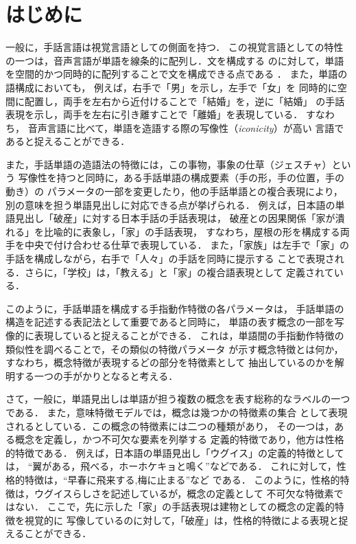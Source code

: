 \thispagestyle{plain}
\maketitle


\section {はじめに}\label{hajime}

一般に，手話言語は視覚言語としての側面を持つ．
この視覚言語としての特性の一つは，音声言語が単語を線条的に配列し．文を構成する
のに対して，単語を空間的かつ同時的に配列することで文を構成できる点である
\cite{Baker1980}．
また，単語の語構成においても，
例えば，右手で「男」を示し，左手で「女」を
同時的に空間に配置し，両手を左右から近付けることで「結婚」を，逆に「結婚」
の手話表現を示し，両手を左右に引き離すことで「離婚」を表現している．
すなわち，
音声言語に比べて，単語を造語する際の{\gt 写像性}（{\it iconicity}）が高い
言語であると捉えることができる．

また，手話単語の造語法の特徴には，この事物，事象の仕草（ジェスチャ）という
写像性を持つと同時に，ある手話単語の構成要素（手の形，手の位置，手の動き）の
パラメータの一部を変更したり，他の手話単語との複合表現により，
別の意味を担う単語見出しに対応できる点が挙げられる\cite{Ichida1994}．
例えば，日本語の単語見出し「破産」に対する日本手話の手話表現は，
破産との因果関係「家が潰れる」を比喩的に表象し，「家」の手話表現，
すなわち，屋根の形を構成する両手を中央で付け合わせる仕草で表現している．
また，「家族」は左手で「家」の手話を構成しながら，右手で「人々」の手話を同時に提示する
ことで表現される．さらに，「学校」は，「教える」と「家」の複合語表現として
定義されている\cite{Honna1994}．

このように，手話単語を構成する手指動作特徴の各パラメータは，
手話単語の構造を記述する表記法として重要である\cite{Yonekawa1984}と同時に，
単語の表す概念の一部を写像的に表現していると捉えることができる．
これは，単語間の手指動作特徴の類似性を調べることで，その類似の特徴パラメータ
が示す概念特徴とは何か，すなわち，概念特徴が表現するどの部分を特徴素として
抽出しているのかを解明する一つの手がかりとなると考える．

さて，一般に，単語見出しは単語が担う複数の概念を表す総称的なラベルの一つである．
また，意味特徴モデル\cite{Smith1974}では，概念は幾つかの特徴素の集合
として表現されるとしている．この概念の特徴素には二つの種類があり，
その一つは，ある概念を定義し，かつ不可欠な要素を列挙する
{\gt 定義的特徴}であり，他方は{\gt 性格的特徴}である．
例えば，日本語の単語見出し「ウグイス」の定義的特徴としては，
``翼がある，飛べる，ホーホケキョと鳴く''などである．
これに対して，性格的特徴は，``早春に飛来する,梅に止まる''など
である．
このように，性格的特徴は，ウグイスらしさを記述しているが，概念の定義として
不可欠な特徴素ではない\cite{Ohsima1986}．
ここで，先に示した「家」の手話表現は建物としての概念の定義的特徴を視覚的に
写像しているのに対して，「破産」は，性格的特徴による表現と捉えることができる．

